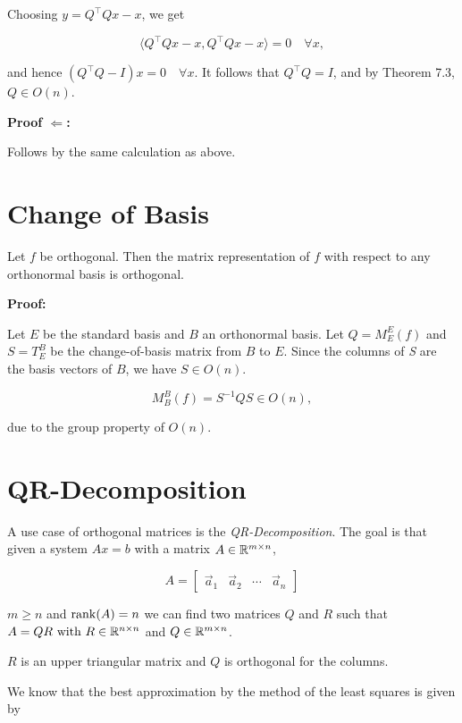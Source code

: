 Choosing \( y = Q^\top Qx - x \), we get

\[
    \langle Q^\top Qx - x, Q^\top Qx - x \rangle = 0 \quad \forall x,
\]

and hence \( (Q^\top Q - I)x = 0 \quad \forall x \).  
It follows that \( Q^\top Q = I \), and by Theorem 7.3, \( Q \in O(n) \).

\QED

\textbf{Proof \(\Leftarrow\):} 

Follows by the same calculation as above.

\QED

\section{Change of Basis}

Let \(f\) be orthogonal. Then the matrix representation of \(f\)  with respect to any orthonormal basis is orthogonal.

\textbf{Proof:} 

Let \( E \) be the standard basis and \(B\) an orthonormal basis. Let  
\( Q = M_E^E(f) \) and \( S = T_E^B \) be the change-of-basis matrix from \(B\) to \( E \).  
Since the columns of \emph{S} are the basis vectors of \(B\), we have \( S \in O(n) \).  

\[
    M_B^B(f) = S^{-1} Q S \in O(n),
\]

due to the group property of \( O(n) \).

\QED

\section{QR-Decomposition}

A use case of orthogonal matrices is the \emph{QR-Decomposition}. The goal is that given a system 
\( Ax = b\) with a matrix \(A\in \mathbb{R}^{m \times n}\), 

\[
    A = 
    \begin{bmatrix}
        \vec{a}_{1} & \vec{a}_{2} & \cdots & \vec{a}_{n}
    \end{bmatrix}
\]

\(m \ge n\) and \(\mathrm{rank}(A) = n\) we can find 
two matrices \(Q\) and \(R\) such that \(A = QR \text{ with } R\in \mathbb{R}^{n \times n}\)  
and \(Q \in \mathbb{R}^{m \times n}\). 

\(R\) is an upper triangular matrix and \(Q\) is orthogonal for the columns.

We know that the best approximation by the method of the least squares is given by

